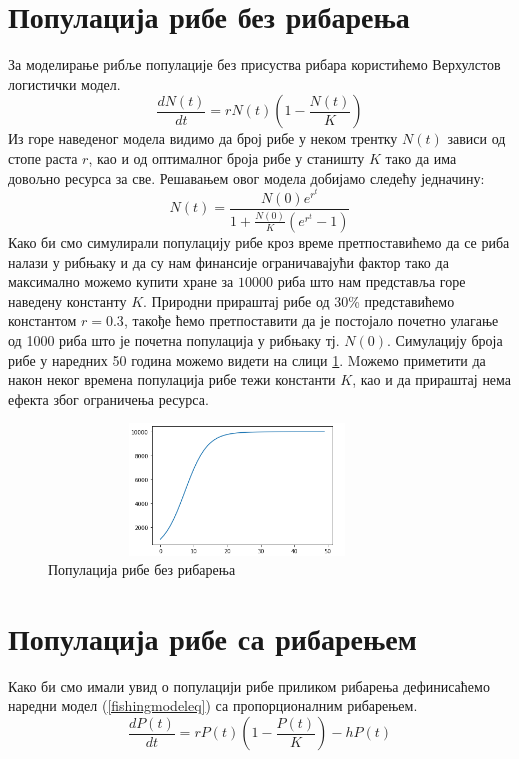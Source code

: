\documentclass[a4paper]{article}
\begin{document}
{\section{Популација рибе без рибарења}
\label{sec:nofishing}
За моделирање рибље популације без присуства рибара користићемо Верхулстов логистички модел.
\begin{equation}
    \frac{dN(t)}{dt} = rN(t)\left(1-\frac{N(t)}{K}\right)
\end{equation}
Из горе наведеног модела видимо да број рибе у неком трентку $N(t)$ зависи од стопе раста $r$, као и од оптималног броја рибе у станишту $K $ тако да има довољно ресурса за све. Решавањем овог модела добијамо следећу једначину:
\begin{equation}
    N(t) = \frac{N(0)e^r^t}{1+\frac{N(0)}{K}(e^r^t - 1)}
\end{equation}
Како би смо симулирали популацију рибе кроз време претпоставићемо да се риба налази у рибњаку и да су нам финансије ограничавајући фактор тако да максимално можемо купити хране за $10000$ риба што нам представља горе наведену константу $K$. Природни прираштај рибе од 30\% представићемо константом $r=0.3$, такође ћемо претпоставити да је постојало почетно улагање од 1000 риба што је почетна популација у рибњаку тј. $N(0)$. Симулацију броја рибе у наредних 50 година можемо видети на слици \ref{fishnofishing_view}. Mожемо приметити да након неког времена популација рибе тежи константи $K$, као и да прираштај нема ефекта због ограничења ресурса.
\begin{figure}[h!]
	\centering
	\includegraphics[width=10cm,height=3.5cm]{images/FishPopulationNoFishing.png}
	\caption{Популација рибе без рибарења}
	\label{fishnofishing_view}
\end{figure}


\section{Популација рибе са рибарењем}
\label{sec:fishingmodel}
Како би смо имали увид о популацији рибе приликом рибарења дефинисаћемо наредни модел (\ref{fishingmodeleq}) са пропорционалним рибарењем.
\begin{equation}
    \label{fishingmodeleq}
    \frac{dP(t)}{dt} = rP(t)\left(1-\frac{P(t)}{K}\right) - hP(t)
\end{equation}

}
\end{document}
